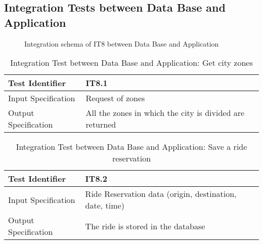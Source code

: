 \documentclass[a4paper]{article}
\begin{document}
\subsection{Integration Tests between Data Base and Application}

\begin{figure} [H]
\caption{Integration schema of IT8 between Data Base and Application}
\end{figure}


\begin{table} [H]
\begin{center}
\begin{tabular}{| L | p{\rightcol} |}
  \hline
  Test Identifier & IT8.1 \\
  \hline
  Input Specification & Request of zones\\
  \hline
  Output Specification & All the zones in which the city is divided are returned\\
  \hline
\end{tabular}
\end{center}
\caption{Integration Test between Data Base and Application: Get city zones}
\end{table}

\begin{table} [H]
\begin{center}
\begin{tabular}{| L | p{\rightcol} |}
  \hline
  Test Identifier & IT8.2 \\
  \hline
  Input Specification & Ride Reservation data (origin, destination, date, time)\\
  \hline
  Output Specification & The ride is stored in the database\\
  \hline
\end{tabular}
\end{center}
\caption{Integration Test between Data Base and Application: Save a ride reservation}
\end{table}
\end{document}
